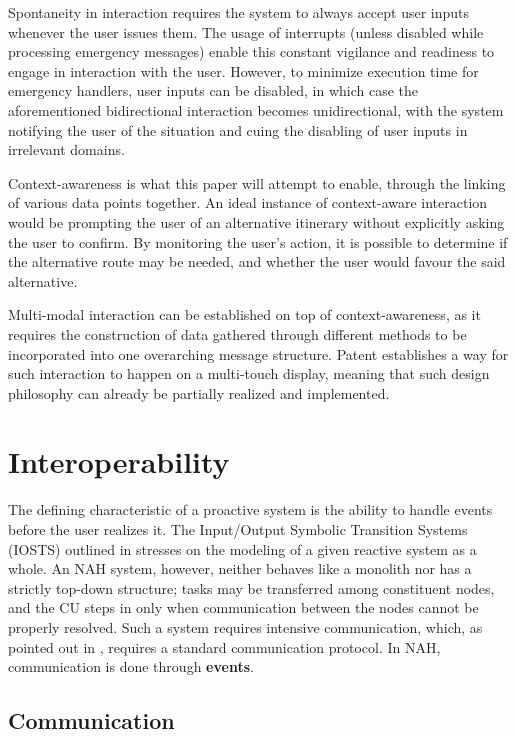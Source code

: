 \documentclass[letterpaper, twocolumn, 10pt, conference]{IEEEtran}
\newcommand{\term}[1]{\textbf{#1}}
\begin{document}
Spontaneity in interaction requires the system to always accept user inputs whenever the user issues them. The usage of interrupts (unless disabled while processing emergency messages) enable this constant vigilance and readiness to engage in interaction with the user. However, to minimize execution time for emergency handlers, user inputs can be disabled, in which case the aforementioned bidirectional interaction becomes unidirectional, with the system notifying the user of the situation and cuing the disabling of user inputs in irrelevant domains.

Context-awareness is what this paper will attempt to enable, through the linking of various data points together. An ideal instance of context-aware interaction would be prompting the user of an alternative itinerary without explicitly asking the user to confirm. By monitoring the user's action, it is possible to determine if the alternative route may be needed, and whether the user would favour the said alternative.

Multi-modal interaction can be established on top of context-awareness, as it requires the construction of data gathered through different methods to be incorporated into one overarching message structure. Patent \cite{wigdor2013multi} establishes a way for such interaction to happen on a multi-touch display, meaning that such design philosophy can already be partially realized and implemented.

\section{Interoperability} \label{sec:interoperability}

The defining characteristic of a proactive system is the ability to handle events before the user realizes it. The Input/Output Symbolic Transition Systems (IOSTS) outlined in \cite{sartor:tel-00748676} stresses on the modeling of a given reactive system as a whole. An NAH system, however, neither behaves like a monolith nor has a strictly top-down structure; tasks may be transferred among constituent nodes, and the CU steps in only when communication between the nodes cannot be properly resolved. Such a system requires intensive communication, which, as pointed out in \cite{sartor:tel-00748676}, requires a standard communication protocol. In NAH, communication is done through \term{events}.

\subsection{Communication} \label{ssec:communication}
\end{document}
